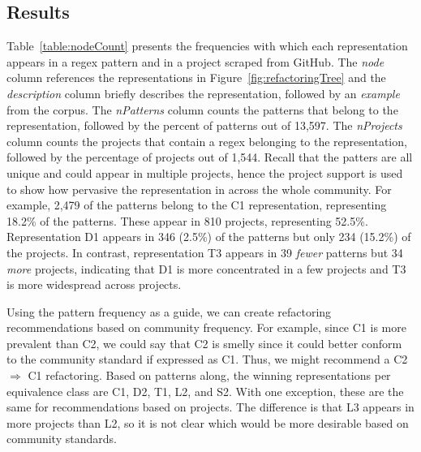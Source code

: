 \subsection{Results}
Table~\ref{table:nodeCount} presents the frequencies with which each representation appears in a regex pattern and in a project scraped from GitHub. The \emph{node} column references the representations in Figure~\ref{fig:refactoringTree} and the \emph{description} column briefly describes the representation, followed by an \emph{example} from the corpus. The \emph{nPatterns} column counts the patterns that belong to the representation, followed by the percent of patterns out of 13,597.
The \emph{nProjects} column counts the projects that contain a regex belonging to the representation, 
followed by the percentage of projects out of 1,544.  
Recall that the patters are all unique and could appear in multiple projects, hence the project support is used to show how pervasive the representation in across the whole community.
For example, 2,479 of the patterns belong to the C1 representation, representing 18.2\% of the patterns. These appear in 810 projects, representing 52.5\%. 
 Representation D1 appears in 346 (2.5\%) of the patterns but only 234 (15.2\%) of the projects. In contrast, representation T3 appears in 39 \emph{fewer} patterns but 34 \emph{more} projects, indicating that D1 is more concentrated in a few projects and T3 is more widespread across projects.

Using the pattern frequency as a guide, we can create refactoring recommendations based on community frequency. For example, since C1 is more prevalent than C2, we could say that C2 is smelly since it could better conform to the community standard if expressed as C1. Thus, we might recommend a C2 $\Rightarrow$ C1 refactoring. Based on patterns along, the winning representations per equivalence class are C1, D2, T1, L2, and S2. With one exception, these are the same for recommendations based on projects. The difference is that L3 appears in more projects than L2, so it is not clear which would be more desirable based on community standards. 







